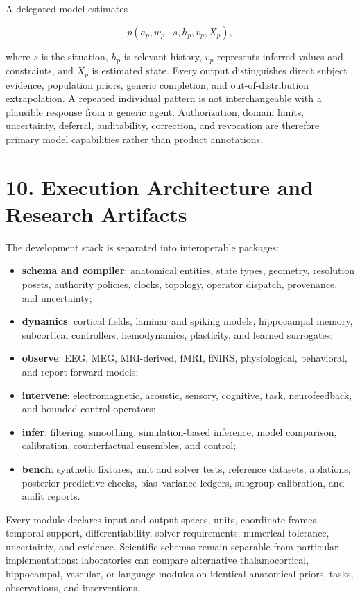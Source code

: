 A delegated model estimates

\[
p(a_p,w_p\mid s,h_p,v_p,X_p),
\]

where \(s\) is the situation, \(h_p\) is relevant history, \(v_p\) represents
inferred values and constraints, and \(X_p\) is estimated state. Every output
distinguishes direct subject evidence, population priors, generic completion,
and out-of-distribution extrapolation. A repeated individual pattern is not
interchangeable with a plausible response from a generic agent. Authorization,
domain limits, uncertainty, deferral, auditability, correction, and revocation
are therefore primary model capabilities rather than product annotations.

\section{10. Execution Architecture and Research Artifacts}

The development stack is separated into interoperable packages:

\begin{itemize}
\item \textbf{schema and compiler}: anatomical entities, state types,
  geometry, resolution posets, authority policies, clocks, topology, operator
  dispatch, provenance, and uncertainty;
\item \textbf{dynamics}: cortical fields, laminar and spiking models,
  hippocampal memory, subcortical controllers, hemodynamics, plasticity, and
  learned surrogates;
\item \textbf{observe}: EEG, MEG, MRI-derived, fMRI, fNIRS, physiological,
  behavioral, and report forward models;
\item \textbf{intervene}: electromagnetic, acoustic, sensory, cognitive,
  task, neurofeedback, and bounded control operators;
\item \textbf{infer}: filtering, smoothing, simulation-based inference,
  model comparison, calibration, counterfactual ensembles, and control;
\item \textbf{bench}: synthetic fixtures, unit and solver tests, reference
  datasets, ablations, posterior predictive checks, bias--variance ledgers,
  subgroup calibration, and audit reports.
\end{itemize}

Every module declares input and output spaces, units, coordinate frames,
temporal support, differentiability, solver requirements, numerical tolerance,
uncertainty, and evidence. Scientific schemas remain separable from particular
implementations: laboratories can compare alternative thalamocortical,
hippocampal, vascular, or language modules on identical anatomical priors,
tasks, observations, and interventions.

